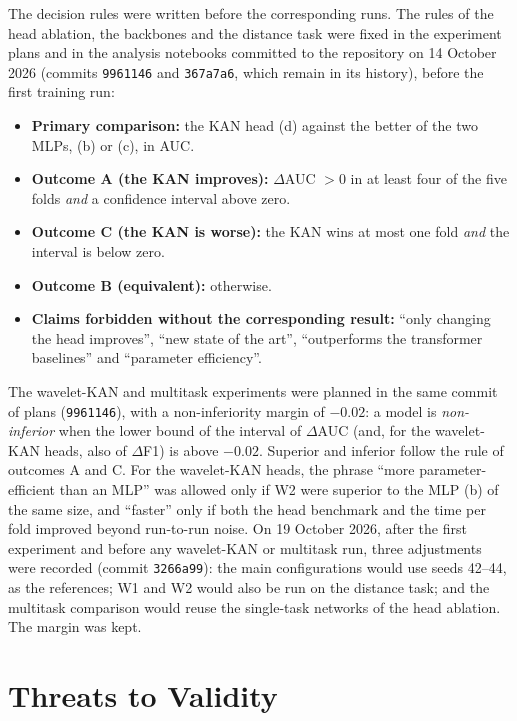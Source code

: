 The decision rules were written before the corresponding runs. The rules of the head ablation, the backbones and the distance task were fixed in the experiment plans and in the analysis notebooks committed to the repository on 14 October 2026 (commits \texttt{9961146} and \texttt{367a7a6}, which remain in its history), before the first training run:
\begin{itemize}
    \item \textbf{Primary comparison:} the KAN head (d) against the better of the two MLPs, (b) or (c), in AUC.
    \item \textbf{Outcome A (the KAN improves):} $\Delta$AUC $> 0$ in at least four of the five folds \emph{and} a confidence interval above zero.
    \item \textbf{Outcome C (the KAN is worse):} the KAN wins at most one fold \emph{and} the interval is below zero.
    \item \textbf{Outcome B (equivalent):} otherwise.
    \item \textbf{Claims forbidden without the corresponding result:} ``only changing the head improves'', ``new state of the art'', ``outperforms the transformer baselines'' and ``parameter efficiency''.
\end{itemize}

The wavelet-KAN and multitask experiments were planned in the same commit of plans (\texttt{9961146}), with a non-inferiority margin of $-0.02$: a model is \emph{non-inferior} when the lower bound of the interval of $\Delta$AUC (and, for the wavelet-KAN heads, also of $\Delta$F1) is above $-0.02$. Superior and inferior follow the rule of outcomes A and C. For the wavelet-KAN heads, the phrase ``more parameter-efficient than an MLP'' was allowed only if W2 were superior to the MLP (b) of the same size, and ``faster'' only if both the head benchmark and the time per fold improved beyond run-to-run noise. On 19 October 2026, after the first experiment and before any wavelet-KAN or multitask run, three adjustments were recorded (commit \texttt{3266a99}): the main configurations would use seeds 42--44, as the references; W1 and W2 would also be run on the distance task; and the multitask comparison would reuse the single-task networks of the head ablation. The margin was kept.

\section{Threats to Validity}
\label{sec:threats}

